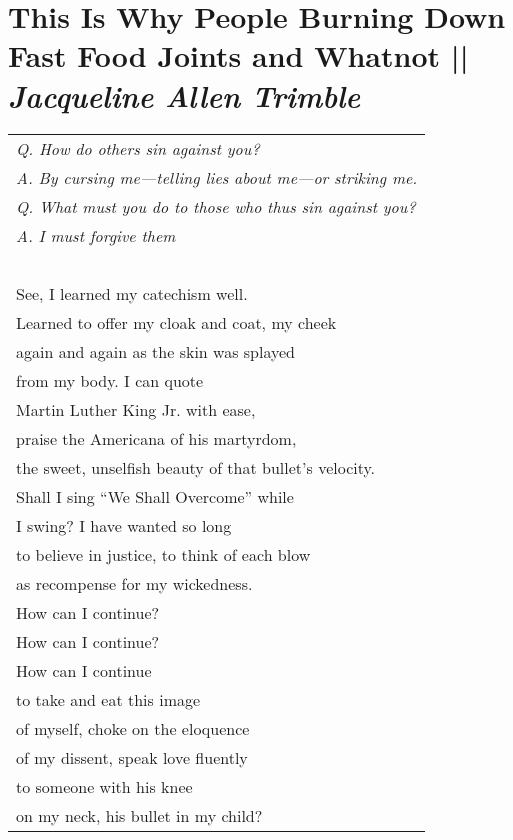 \section[This Is Why People Burning Down Fast Food Joints and Whatnot]{This Is Why People Burning Down Fast Food Joints and Whatnot || \emph{Jacqueline Allen Trimble} \hspace*{\fill}  \thepage}
\vspace*{0cm}
\begin{center}
\begin{tabular}{l}
    \emph{Q. How do others sin against you?}\\
    \emph{A. By cursing me—telling lies about me—or striking me.}\\
    \emph{Q. What must you do to those who thus sin against you?}\\
    \emph{A. I must forgive them}\\
    
    \-\ \\See, I learned my catechism well.\\
    Learned to offer my cloak and coat, my cheek\\
    again and again as the skin was splayed\\
    from my body. I can quote\\
    Martin Luther King Jr. with ease,\\
    praise the Americana of his martyrdom,\\
    the sweet, unselfish beauty of that bullet’s velocity.\\
    Shall I sing “We Shall Overcome” while\\
    I swing? I have wanted so long\\
    to believe in justice, to think of each blow\\
    as recompense for my wickedness.\\
    How can I continue?\\
    How can I continue?\\
    How can I continue\\
    to take and eat this image\\
    of myself, choke on the eloquence\\
    of my dissent, speak love fluently\\
    to someone with his knee\\
    on my neck, his bullet in my child?
\end{tabular}
\end{center}